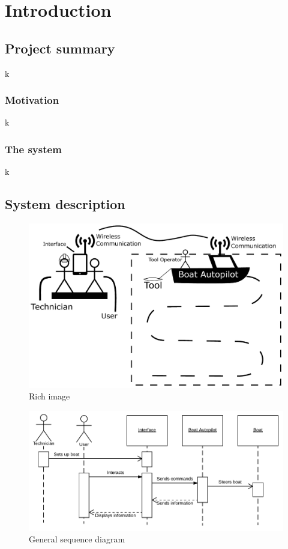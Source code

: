 \chapter{Introduction}

\section{Project summary}
k

\subsection{Motivation}
k

\subsection{The system}
k

\section{System description}
\begin{figure}[H]
	\centering
	\includegraphics[width=1\linewidth]{Images/rich_image}
	\caption{Rich image}
\end{figure}

\begin{figure}[H]
	\centering
	\includegraphics[width=1\linewidth]{Images/General_SD}
	\caption{General sequence diagram}
\end{figure}

